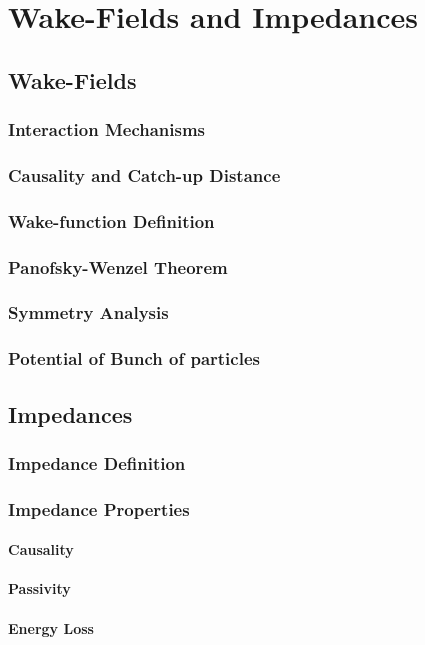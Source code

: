 \documentclass[
	12pt,				%
	openright,			%
	oneside,			%
	a4paper,		%
	chapter=TITLE,		%
	section=TITLE,		%
    brazil,				%
	english,			%
	sumario=tradicional,
	]{abntex2}
\begin{document}
\chapter{Wake-Fields and Impedances}
  \section{Wake-Fields}
    \subsection{Interaction Mechanisms}
    \subsection{Causality and Catch-up Distance}
    \subsection{Wake-function Definition}
    \subsection{Panofsky-Wenzel Theorem}
    \subsection{Symmetry Analysis}
    \subsection{Potential of Bunch of particles}
  \section{Impedances}
    \subsection{Impedance Definition}
    \subsection{Impedance Properties}
      \subsubsection{Causality}
      \subsubsection{Passivity}
      \subsubsection{Energy Loss}
\end{document}
